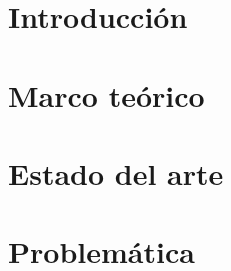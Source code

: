 \documentclass[10pt]{book}
\begin{document}

\thispagestyle{empty}


\frontmatter
\tableofcontents
\listoffigures
\mainmatter

 \hideControlVersion

\chapter{Introducción}\label{chp:introduccion}
\hypertarget{chp:introduccion}{}
\chapter{Marco teórico}\label{chp:marcoTeorico} 
\hypertarget{chp:marcoTeorico}{}
\chapter{Estado del arte}\label{chp:estadoArte} 
\hypertarget{chp:estadoArte}{}

\chapter{Problemática}\label{chp:problematica}
\hypertarget{chp:problematica}{}





\end{document}

